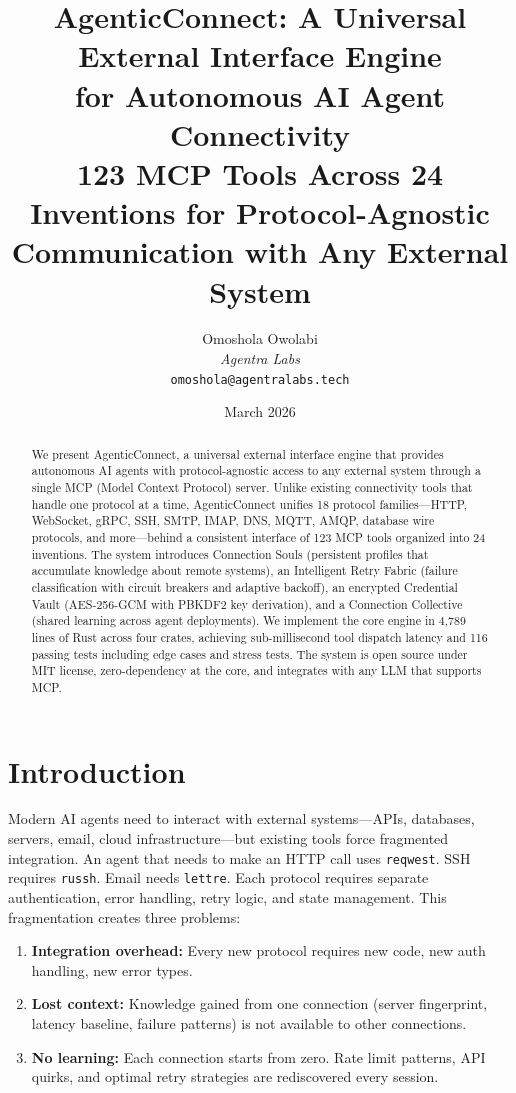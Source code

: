 \documentclass[10pt,twocolumn]{article}
\title{\textbf{AgenticConnect: A Universal External Interface Engine\\for Autonomous AI Agent Connectivity}\\[0.5em]
\large{123 MCP Tools Across 24 Inventions for Protocol-Agnostic\\Communication with Any External System}}
\author{
    Omoshola Owolabi\\
    \textit{Agentra Labs}\\
    \texttt{omoshola@agentralabs.tech}
}
\date{March 2026}
\begin{document}
\maketitle

\begin{abstract}
We present AgenticConnect, a universal external interface engine that provides autonomous AI agents with protocol-agnostic access to any external system through a single MCP (Model Context Protocol) server. Unlike existing connectivity tools that handle one protocol at a time, AgenticConnect unifies 18 protocol families—HTTP, WebSocket, gRPC, SSH, SMTP, IMAP, DNS, MQTT, AMQP, database wire protocols, and more—behind a consistent interface of 123 MCP tools organized into 24 inventions. The system introduces Connection Souls (persistent profiles that accumulate knowledge about remote systems), an Intelligent Retry Fabric (failure classification with circuit breakers and adaptive backoff), an encrypted Credential Vault (AES-256-GCM with PBKDF2 key derivation), and a Connection Collective (shared learning across agent deployments). We implement the core engine in 4,789 lines of Rust across four crates, achieving sub-millisecond tool dispatch latency and 116 passing tests including edge cases and stress tests. The system is open source under MIT license, zero-dependency at the core, and integrates with any LLM that supports MCP.
\end{abstract}

\section{Introduction}

Modern AI agents need to interact with external systems—APIs, databases, servers, email, cloud infrastructure—but existing tools force fragmented integration. An agent that needs to make an HTTP call uses \texttt{reqwest}. SSH requires \texttt{russh}. Email needs \texttt{lettre}. Each protocol requires separate authentication, error handling, retry logic, and state management. This fragmentation creates three problems:

\begin{enumerate}[leftmargin=*]
    \item \textbf{Integration overhead:} Every new protocol requires new code, new auth handling, new error types.
    \item \textbf{Lost context:} Knowledge gained from one connection (server fingerprint, latency baseline, failure patterns) is not available to other connections.
    \item \textbf{No learning:} Each connection starts from zero. Rate limit patterns, API quirks, and optimal retry strategies are rediscovered every session.
\end{enumerate}
\end{document}
